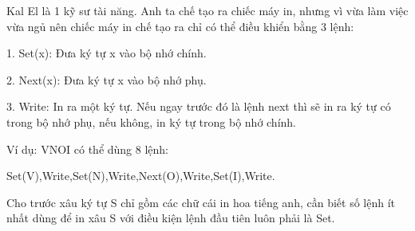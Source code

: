 Kal El là 1 kỹ sư tài năng. Anh ta chế tạo ra chiếc máy in, nhưng vì vừa làm việc vừa ngủ nên chiếc máy in chế tạo ra chỉ có thể điều khiển bằng 3 lệnh:   

    1. Set(x): Đưa ký tự x vào bộ nhớ chính.   

    2. Next(x): Đưa ký tự x vào bộ nhớ phụ.   

    3. Write: In ra một ký tự. Nếu ngay trước đó là lệnh next thì sẽ in ra ký tự có trong bộ nhớ phụ, nếu không, in ký tự trong bộ nhớ chính.   

    Ví dụ: VNOI có thể dùng 8 lệnh:   

    Set(V),Write,Set(N),Write,Next(O),Write,Set(I),Write.   

    Cho trước xâu ký tự S chỉ gồm các chữ cái in hoa tiếng anh, cần biết số lệnh ít nhất dùng để in xâu S với điều kiện lệnh đầu tiên luôn phải là Set.